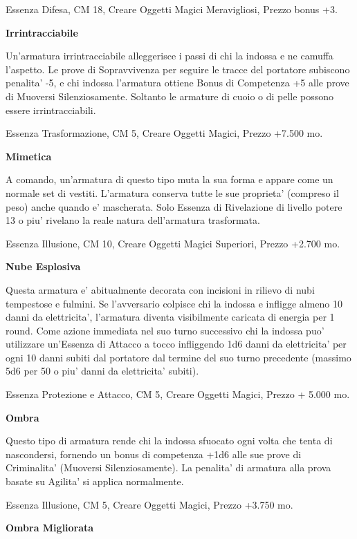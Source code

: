 \documentclass[a4paper,11pt,twoside,openany]{book}
\begin{document}
{		Essenza Difesa, CM 18, Creare Oggetti Magici Meravigliosi, Prezzo bonus +3.
		
		\textbf{Irrintracciabile}
		
		Un'armatura irrintracciabile alleggerisce i passi di chi la indossa e ne camuffa l'aspetto. Le prove di Sopravvivenza per seguire le tracce del portatore subiscono penalita' -5, e chi indossa l'armatura ottiene Bonus di Competenza +5 alle prove di Muoversi Silenziosamente. Soltanto le armature di cuoio o di pelle possono essere irrintracciabili. 
		
		Essenza Trasformazione, CM 5, Creare Oggetti Magici, Prezzo +7.500
		mo.
		
		\textbf{Mimetica}
		
		A comando, un'armatura di questo tipo muta la sua forma e appare come un normale set di vestiti. L'armatura conserva tutte le sue proprieta' (compreso il peso) anche quando e' mascherata. Solo Essenza di Rivelazione di livello potere 13 o piu' rivelano la reale natura dell'armatura trasformata.
		
		Essenza Illusione, CM 10, Creare Oggetti Magici Superiori, Prezzo +2.700 mo.
		
		\textbf{Nube Esplosiva}
		
		Questa armatura e' abitualmente decorata con incisioni in rilievo di nubi tempestose e fulmini. Se l'avversario colpisce chi la indossa e infligge almeno 10 danni da elettricita', l'armatura diventa visibilmente caricata di energia per 1 round. Come azione immediata nel suo turno successivo chi la indossa puo' utilizzare un'Essenza di Attacco a tocco infliggendo 1d6 danni da elettricita' per ogni 10 danni subiti dal portatore dal termine del suo turno precedente (massimo 5d6 per 50 o piu' danni da elettricita' subiti).
		
		Essenza Protezione e Attacco, CM 5, Creare Oggetti Magici, Prezzo
		+ 5.000 mo.
		
		\textbf{Ombra}
		
		Questo tipo di armatura rende chi la indossa sfuocato ogni volta che tenta di nascondersi, fornendo un bonus di competenza +1d6 alle sue prove di Criminalita' (Muoversi Silenziosamente). La penalita' di armatura alla prova basate su Agilita' si applica normalmente.
		
		Essenza Illusione, CM 5, Creare Oggetti Magici, Prezzo +3.750 mo.
		
		\textbf{Ombra Migliorata}
		
}
\end{document}
